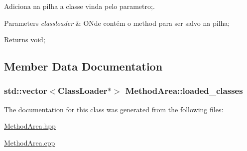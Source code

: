 Adiciona na pilha a classe vinda pelo parametro;. 


\begin{DoxyParams}{Parameters}
{\em classloader} & O\+Nde contém o method para ser salvo na pilha; \\
\hline
\end{DoxyParams}
\begin{DoxyReturn}{Returns}
void; 
\end{DoxyReturn}


\subsection{Member Data Documentation}
\subsubsection[{\texorpdfstring{loaded\+\_\+classes}{loaded_classes}}]{\setlength{\rightskip}{0pt plus 5cm}std\+::vector$<${\bf Class\+Loader}$\ast$$>$ Method\+Area\+::loaded\+\_\+classes}\hypertarget{class_method_area_a933a5cc7cab12dd6e6f2e3146a648b53}{}\label{class_method_area_a933a5cc7cab12dd6e6f2e3146a648b53}


The documentation for this class was generated from the following files\+:\begin{DoxyCompactItemize}
\item 
\hyperlink{_method_area_8hpp}{Method\+Area.\+hpp}\item 
\hyperlink{_method_area_8cpp}{Method\+Area.\+cpp}\end{DoxyCompactItemize}
